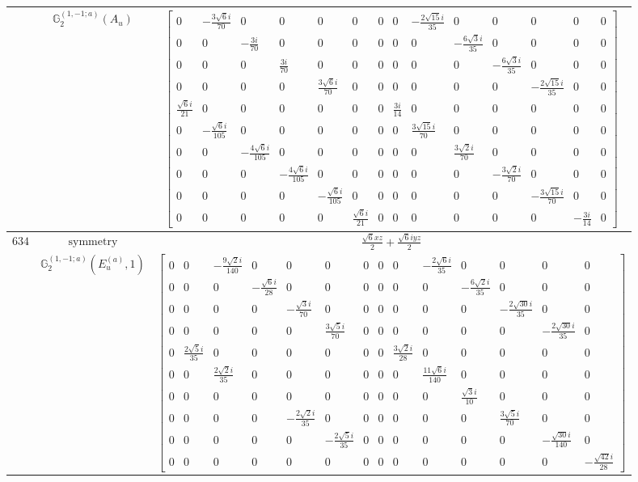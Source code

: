 \documentclass[fleqn,8pt,landscape]{jsarticle}
\begin{document}
\begin{longtable}{ccc}
$  $ & $ \mathbb{G}_{2}^{(1,-1;a)}(A_{u}) $ & $ \begin{bmatrix} 0 & - \frac{3 \sqrt{6} i}{70} & 0 & 0 & 0 & 0 & 0 & 0 & - \frac{2 \sqrt{15} i}{35} & 0 & 0 & 0 & 0 & 0 \\ 0 & 0 & - \frac{3 i}{70} & 0 & 0 & 0 & 0 & 0 & 0 & - \frac{6 \sqrt{3} i}{35} & 0 & 0 & 0 & 0 \\ 0 & 0 & 0 & \frac{3 i}{70} & 0 & 0 & 0 & 0 & 0 & 0 & - \frac{6 \sqrt{3} i}{35} & 0 & 0 & 0 \\ 0 & 0 & 0 & 0 & \frac{3 \sqrt{6} i}{70} & 0 & 0 & 0 & 0 & 0 & 0 & - \frac{2 \sqrt{15} i}{35} & 0 & 0 \\ \frac{\sqrt{6} i}{21} & 0 & 0 & 0 & 0 & 0 & 0 & \frac{3 i}{14} & 0 & 0 & 0 & 0 & 0 & 0 \\ 0 & - \frac{\sqrt{6} i}{105} & 0 & 0 & 0 & 0 & 0 & 0 & \frac{3 \sqrt{15} i}{70} & 0 & 0 & 0 & 0 & 0 \\ 0 & 0 & - \frac{4 \sqrt{6} i}{105} & 0 & 0 & 0 & 0 & 0 & 0 & \frac{3 \sqrt{2} i}{70} & 0 & 0 & 0 & 0 \\ 0 & 0 & 0 & - \frac{4 \sqrt{6} i}{105} & 0 & 0 & 0 & 0 & 0 & 0 & - \frac{3 \sqrt{2} i}{70} & 0 & 0 & 0 \\ 0 & 0 & 0 & 0 & - \frac{\sqrt{6} i}{105} & 0 & 0 & 0 & 0 & 0 & 0 & - \frac{3 \sqrt{15} i}{70} & 0 & 0 \\ 0 & 0 & 0 & 0 & 0 & \frac{\sqrt{6} i}{21} & 0 & 0 & 0 & 0 & 0 & 0 & - \frac{3 i}{14} & 0 \end{bmatrix} $ \\ \hline
$ 634 $ & $ \text{symmetry} $ & $ \frac{\sqrt{6} x z}{2} + \frac{\sqrt{6} i y z}{2} $ \\
$  $ & $ \mathbb{G}_{2}^{(1,-1;a)}(E_{u}^{(a)},1) $ & $ \begin{bmatrix} 0 & 0 & - \frac{9 \sqrt{2} i}{140} & 0 & 0 & 0 & 0 & 0 & 0 & - \frac{2 \sqrt{6} i}{35} & 0 & 0 & 0 & 0 \\ 0 & 0 & 0 & - \frac{\sqrt{6} i}{28} & 0 & 0 & 0 & 0 & 0 & 0 & - \frac{6 \sqrt{2} i}{35} & 0 & 0 & 0 \\ 0 & 0 & 0 & 0 & - \frac{\sqrt{3} i}{70} & 0 & 0 & 0 & 0 & 0 & 0 & - \frac{2 \sqrt{30} i}{35} & 0 & 0 \\ 0 & 0 & 0 & 0 & 0 & \frac{3 \sqrt{5} i}{70} & 0 & 0 & 0 & 0 & 0 & 0 & - \frac{2 \sqrt{30} i}{35} & 0 \\ 0 & \frac{2 \sqrt{5} i}{35} & 0 & 0 & 0 & 0 & 0 & 0 & \frac{3 \sqrt{2} i}{28} & 0 & 0 & 0 & 0 & 0 \\ 0 & 0 & \frac{2 \sqrt{2} i}{35} & 0 & 0 & 0 & 0 & 0 & 0 & \frac{11 \sqrt{6} i}{140} & 0 & 0 & 0 & 0 \\ 0 & 0 & 0 & 0 & 0 & 0 & 0 & 0 & 0 & 0 & \frac{\sqrt{3} i}{10} & 0 & 0 & 0 \\ 0 & 0 & 0 & 0 & - \frac{2 \sqrt{2} i}{35} & 0 & 0 & 0 & 0 & 0 & 0 & \frac{3 \sqrt{5} i}{70} & 0 & 0 \\ 0 & 0 & 0 & 0 & 0 & - \frac{2 \sqrt{5} i}{35} & 0 & 0 & 0 & 0 & 0 & 0 & - \frac{\sqrt{30} i}{140} & 0 \\ 0 & 0 & 0 & 0 & 0 & 0 & 0 & 0 & 0 & 0 & 0 & 0 & 0 & - \frac{\sqrt{42} i}{28} \end{bmatrix} $ \\ \hline

\end{longtable}
\end{document}
